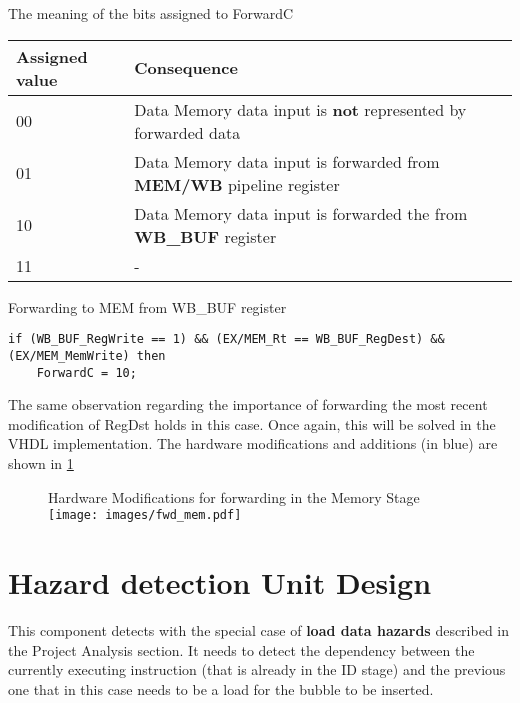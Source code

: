 \documentclass[a4paper,12pt]{report}
\begin{document}
\begin{my-table}{The meaning of the bits assigned to ForwardC}
    \begin{center}
    \begin{tabular}{| m{6em} | m{10cm} |}
        \hline
        \textbf{Assigned value} & \textbf{Consequence}\\
         \hline
         00 &  Data Memory data input is \textbf{not} represented by forwarded data\\
        \hline
         01 &  Data Memory data input is forwarded from \textbf{MEM/WB} pipeline register\\
        \hline
         10 &  Data Memory data input is forwarded the from \textbf{WB\_BUF} register\\
        \hline
         11 &  -\\
        \hline
    \end{tabular}
    \end{center}
    \label{table:1}
\end{my-table}

\begin{my-listing}{Forwarding to MEM from WB\_BUF register}
    \begin{lstlisting}[style=vhdl]
if (WB_BUF_RegWrite == 1) && (EX/MEM_Rt == WB_BUF_RegDest) && (EX/MEM_MemWrite) then
    ForwardC = 10;
    \end{lstlisting}
\end{my-listing}

The same observation regarding the importance of forwarding the most recent modification of RegDst holds in this case. Once again, this will be solved in the VHDL implementation. The hardware modifications and additions (in blue) are shown in \ref{fig:fwd_mem}

\begin{figure}
\begin{my-figure}{Hardware Modifications for forwarding in the Memory Stage}
    \centering
    \texttt{[image: images/fwd\_mem.pdf]}
    \label{fig:fwd_mem}
\end{my-figure}
\end{figure}

\section{Hazard detection Unit Design}
This component detects with the special case of \textbf{load data hazards} described in the Project Analysis section. It needs to detect the dependency between the currently executing instruction (that is already in the ID stage) and the previous one that in this case needs to be a load for the bubble to be inserted.
\end{document}
